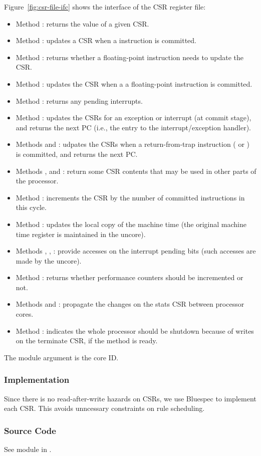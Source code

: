 Figure~\ref{fig:csr-file-ifc} shows the interface of the CSR register file:
\begin{itemize}
    \item Method : returns the value of a given CSR.
    \item Method : updates a CSR when a  instruction is committed.
    \item Method : returns whether a floating-point instruction needs to update the  CSR.
    \item Method : updates the  CSR when a a floating-point instruction is committed.
    \item Method : returns any pending interrupts.
    \item Method : updates the CSRs for an exception or interrupt (at commit stage), and returns the next PC (i.e., the entry to the interrupt/exception handler).
    \item Methods  and : udpates the CSRs when a return-from-trap instruction ( or ) is committed, and returns the next PC.
    \item Methods ,  and : return some CSR contents that may be used in other parts of the processor.
    \item Method : increments the  CSR by the number of committed instructions in this cycle.
    \item Method : updates the local copy of the machine time (the original machine time register is maintained in the uncore).
    \item Methods , , : provide accesses on the interrupt pending bits (such accesses are made by the uncore).
    \item Method : returns whether performance counters should be incremented or not.
    \item Methods  and : propagate the changes on the stats CSR between processor cores.
    \item Method : indicates the whole processor should be shutdown because of writes on the terminate CSR, if the method is ready.
\end{itemize}
The module argument  is the core ID.

\subsubsection{Implementation}
Since there is no read-after-write hazards on CSRs, we use Bluespec  to implement each CSR.
This avoids unncessary constraints on rule scheduling.

\subsubsection{Source Code}
See module  in .
